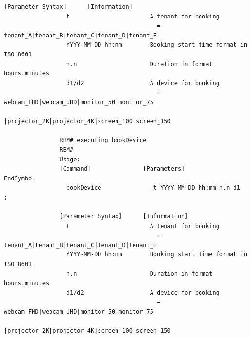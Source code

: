 \documentclass{article}
\begin{document}
\begin{Verbatim}[gobble=8]
                [Parameter Syntax]      [Information]                                         
                  t                       A tenant for booking                                
                                            = tenant_A|tenant_B|tenant_C|tenant_D|tenant_E    
                  YYYY-MM-DD hh:mm        Booking start time format in ISO 8601               
                  n.n                     Duration in format hours.minutes                    
                  d1/d2                   A device for booking                                
                                            = webcam_FHD|webcam_UHD|monitor_50|monitor_75     
                                              |projector_2K|projector_4K|screen_100|screen_150
                
                RBM# executing bookDevice
                RBM# 
                Usage: 
                [Command]               [Parameters]                            EndSymbol     
                  bookDevice              -t YYYY-MM-DD hh:mm n.n d1              ;           
                
                [Parameter Syntax]      [Information]                                         
                  t                       A tenant for booking                                
                                            = tenant_A|tenant_B|tenant_C|tenant_D|tenant_E    
                  YYYY-MM-DD hh:mm        Booking start time format in ISO 8601               
                  n.n                     Duration in format hours.minutes                    
                  d1/d2                   A device for booking                                
                                            = webcam_FHD|webcam_UHD|monitor_50|monitor_75     
                                              |projector_2K|projector_4K|screen_100|screen_150
                

\end{Verbatim}
\end{document}

